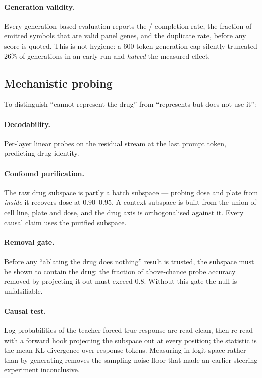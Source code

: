 \paragraph{Generation validity.} Every generation-based evaluation reports the \ENDCELL{}/\DOWN{}
completion rate, the fraction of emitted symbols that are valid panel genes, and the duplicate rate,
before any score is quoted. This is not hygiene: a $600$-token generation cap silently truncated
$26\%$ of generations in an early run and \emph{halved} the measured effect.

\subsection{Mechanistic probing}
\label{sec:methods-probe}

To distinguish ``cannot represent the drug'' from ``represents but does not use it'':

\paragraph{Decodability.} Per-layer linear probes on the residual stream at the last prompt token,
predicting drug identity.

\paragraph{Confound purification.} The raw drug subspace is partly a batch subspace --- probing
dose and plate from \emph{inside} it recovers dose at $0.90$--$0.95$. A context subspace is built
from the union of cell line, plate and dose, and the drug axis is orthogonalised against it. Every
causal claim uses the purified subspace.

\paragraph{Removal gate.} Before any ``ablating the drug does nothing'' result is trusted, the
subspace must be shown to contain the drug: the fraction of above-chance probe accuracy removed by
projecting it out must exceed $0.8$. Without this gate the null is unfalsifiable.

\paragraph{Causal test.} Log-probabilities of the teacher-forced true response are read clean, then
re-read with a forward hook projecting the subspace out at every position; the statistic is the mean
KL divergence over response tokens. Measuring in logit space rather than by generating removes the
sampling-noise floor that made an earlier steering experiment inconclusive.

